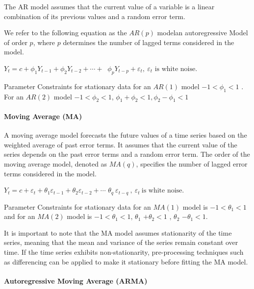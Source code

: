 \documentclass[
]{article}
\begin{document}
The AR model assumes that the current value of a variable is a linear
combination of its previous values and a random error term.

We refer to the following equation as the \(AR(p)\) modelan
autoregressive Model of order \(p\), where \(p\) determines the number
of lagged terms considered in the model.

\(Y_{t} = c + \phi_{1}Y_{t - 1} + \phi_{2}Y_{t - 2} + \cdots +\)
\(\ \phi_{p}Y_{t - p} + \varepsilon_{t} ,\ \varepsilon_{t}\text{ is white noise.}\)

Parameter Constraints for stationary data for an \(AR(1)\) model
\(-1<\phi_{1}<1\) . For an \(AR(2)\) model \(− 1 < \phi_{2} < 1\),
\(\phi_{1}+ \phi_{2}<1 , \phi_{2} − \phi_{1}<1\)

\hypertarget{moving-average-ma}{%
\paragraph{Moving Average (MA)}\label{moving-average-ma}}

A moving average model forecasts the future values of a time series
based on the weighted average of past error terms. It assumes that the
current value of the series depends on the past error terms and a random
error term. The order of the moving average model, denoted as \(MA(q)\),
specifies the number of lagged error terms considered in the model.

\(Y_{t} = c + \varepsilon_{t} + \theta_{1}\varepsilon_{t - 1} + \theta_{2}\varepsilon_{t - 2} + \cdots\)
\(\theta_{q}\ \varepsilon_{t - q}\ ,\ \varepsilon_{t}\ \text{is white noise.}\)

Parameter Constraints for stationary data for an \(MA(1)\) model is
\(-1<\theta_{1}<1\) and for an \(MA(2)\) model is \(-1<\theta_{1}<1\),
\(\theta_{1}\) \(+\theta_{2}<1\) , \(\theta_{2}\) \(-\theta_{1}<1\).

It is important to note that the MA model assumes stationarity of the
time series, meaning that the mean and variance of the series remain
constant over time. If the time series exhibits non-stationarity,
pre-processing techniques such as differencing can be applied to make it
stationary before fitting the MA model.

\hypertarget{autoregressive-moving-average-arma}{%
\paragraph{Autoregressive Moving Average
(ARMA)}\label{autoregressive-moving-average-arma}}
\end{document}
